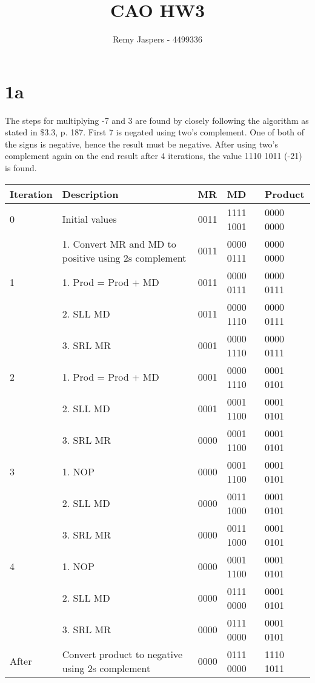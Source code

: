 \documentclass[10pt,a4paper]{article}
\author{Remy Jaspers - 4499336}
\title{CAO HW3}
\begin{document}
	\maketitle
	\section*{1a}
	The steps for multiplying -7 and 3 are found by closely following the algorithm as stated in \$3.3, p. 187. First 7 is negated using two's complement. One of both of the signs is negative, hence the result must be negative. After using two's complement again on the end result after 4 iterations, the value 1110 1011 (-21) is found.
	\begin{table}[h]
		\centering
		\label{my-label}
		\begin{tabular}{|l|l|l|l|l|}
			\hline
			Iteration & Description & MR  & MD & Product   \\ \hline
			0& Initial values  & 0011  & 1111 1001 &  0000 0000 \\ 
			& 1. Convert MR and MD to positive using 2s complement & 0011 & 0000 0111 & 0000 0000 \\ \hline
			1& 1. Prod = Prod + MD &  0011  & 0000 0111 & 0000 0111 \\
			& 2. SLL MD &  0011  & 0000 1110 & 0000 0111 \\
			& 3. SRL MR &  0001  & 0000 1110 & 0000 0111 \\ \hline
			
			2 
			& 1. Prod = Prod + MD &  0001  & 0000 1110 & 0001 0101 \\
			& 2. SLL MD &  0001  & 0001 1100 & 0001 0101 \\
			& 3. SRL MR &  0000  & 0001 1100 & 0001 0101 \\ \hline
			
			3 
			& 1. NOP &  0000  & 0001 1100 & 0001 0101 \\
			& 2. SLL MD &  0000  & 0011 1000 & 0001 0101 \\
			& 3. SRL MR &  0000  & 0011 1000 & 0001 0101 \\ \hline

			4 
			& 1. NOP &  0000  & 0001 1100 & 0001 0101 \\
			& 2. SLL MD &  0000  & 0111 0000 & 0001 0101 \\
			& 3. SRL MR &  0000  & 0111 0000 & 0001 0101 \\ \hline
			

			After
			& Convert product to negative using 2s complement &  0000  & 0111 0000 & 1110 1011 \\ \hline
		\end{tabular}
	\end{table}
\end{document}
